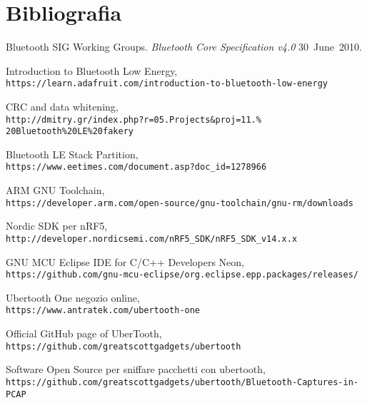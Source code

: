 
\section{Bibliografia}

\begin{thebibliography}{9}

Bluetooth SIG Working Groups. 
\textit{Bluetooth\textsuperscript{\textregistered} Core Specification v4.0}
\mbox{30 June 2010}.

Introduction to Bluetooth Low Energy, 
\\\texttt{https://learn.adafruit.com/introduction-to-bluetooth-low-energy}
 
CRC and data whitening, 
\\\texttt{http://dmitry.gr/index.php?r=05.Projects\&proj=11.\% 20Bluetooth\%20LE\%20fakery}

Bluetooth LE Stack Partition, 
\\\texttt{https://www.eetimes.com/document.asp?doc\_id=1278966}

ARM GNU Toolchain, 
\\\texttt{https://developer.arm.com/open-source/gnu-toolchain/gnu-rm/downloads}

Nordic SDK per nRF5, 
\\\texttt{http://developer.nordicsemi.com/nRF5\_SDK/nRF5\_SDK\_v14.x.x}

GNU MCU Eclipse IDE for C/C++ Developers Neon, 
\\\texttt{https://github.com/gnu-mcu-eclipse/org.eclipse.epp.packages/releases/}

Ubertooth One negozio online, 
\\\texttt{https://www.antratek.com/ubertooth-one}

Official GitHub page of UberTooth, 
\\\texttt{https://github.com/greatscottgadgets/ubertooth}

Software Open Source per sniffare pacchetti con ubertooth, 
\\\texttt{https://github.com/greatscottgadgets/ubertooth/Bluetooth-Captures-in-PCAP}




\end{thebibliography}